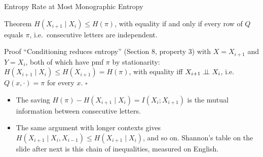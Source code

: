 \begin{frame}{Entropy Rate at Most Monographic Entropy}
  \small
  \begin{block}{Theorem}
    $H(X_{i+1}\mid X_i)\le H(\pi)$, with equality if and only if every row of $Q$ equals $\pi$, i.e.\ consecutive letters are independent.
  \end{block}
  \begin{block}{Proof}
    ``Conditioning reduces entropy'' (Section 8, property 3) with $X=X_{i+1}$ and $Y=X_i$, both of which have pmf $\pi$ by stationarity: $H(X_{i+1}\mid X_i)\le H(X_{i+1})=H(\pi)$, with equality iff $X_{i+1}\perp\!\!\!\perp X_i$, i.e.\ $Q(x,\cdot)=\pi$ for every $x$. \hfill$\square$
  \end{block}
  \begin{itemize}
    \item The saving $H(\pi)-H(X_{i+1}\mid X_i)=I(X_i;X_{i+1})$ is the mutual information between consecutive letters.
    \item The same argument with longer contexts gives $H(X_{i+1}\mid X_i,X_{i-1})\le H(X_{i+1}\mid X_i)$, and so on. Shannon's table on the slide after next is this chain of inequalities, measured on English.
  \end{itemize}
\end{frame}

